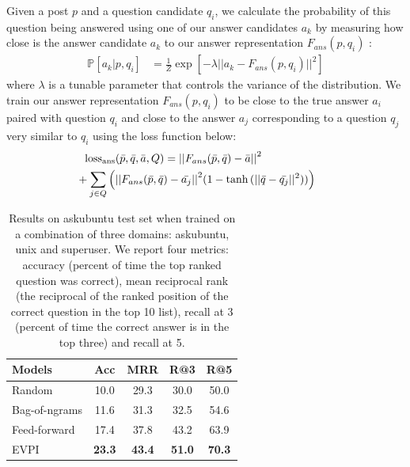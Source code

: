 \documentclass[11pt,a4paper]{article}
\begin{document}
Given a post $p$ and a question candidate $q_i$, we calculate the probability of this question being answered using one of our answer candidates $a_k$ by measuring how close is the answer candidate $a_k$ to our answer representation $ F_{ans}(p,q_i)$ :
\begin{align}
\mathbb{P}[a_k |p,q_i]  
&= \frac 1 Z \exp\left[- \lambda || a_k  -  F_{ans}(p,q_i) ||^2\right]
\end{align}
where $\lambda$ is a tunable parameter that controls the variance of the distribution. We train our answer representation $ F_{ans}(p,q_i)$ to be close to the true answer $a_i$ paired with question $q_i$ and close to the answer $a_j$ corresponding to a question $q_j$ very similar to $q_i$ using the loss function below:
\begin{align}\label{eq_answer_generator}
\textrm{loss}_{\textrm{ans}}(\bar p, \bar q, \bar a, Q) 
&=  {|| F_{ans}(\bar p, \bar q) - \bar a||}^2 & \\
&\hspace{-28mm} +  \sum_{j \in Q} \Big ( {|| F_{ans}(\bar p, \bar q) - \bar{a_j} ||}^2  (1 - \tanh{(|| \bar q - \bar{q_j} ||^2)}) \Big ) &\nonumber
\end{align}

\begin{table}[t]
	\small
	\centering
	\begin{tabular}{l|cccc|}
		\toprule
		\textbf{Models} & Acc & MRR & R@3 & R@5\\
		\midrule
		Random  & 10.0 & 29.3 & 30.0 & 50.0  \\
		Bag-of-ngrams & 11.6 & 31.3 & 32.5 & 54.6  \\
		Feed-forward & 17.4 & 37.8 & 43.2 & 63.9  \\
		EVPI & \bf 23.3 & \bf 43.4 & \bf 51.0 & \bf 70.3 \\
		\bottomrule
	\end{tabular}
	\caption{\small Results on askubuntu test set when trained on a combination of three domains: askubuntu, unix and superuser.  We report four metrics: accuracy (percent of time the top ranked question was correct),
		mean reciprocal rank (the reciprocal of the ranked position of the correct question in the top 10 list), recall at 3 (percent of time the correct answer is in the top three) and
		recall at 5.}
	\label{tab:results_topN}
	\vspace{-1.0em}
\end{table}
\end{document}
